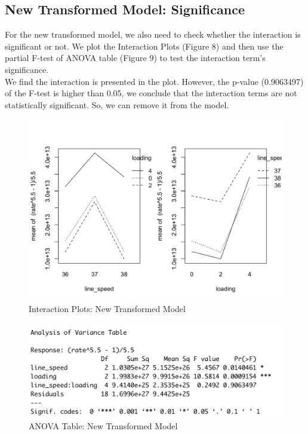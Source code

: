 \documentclass[11pt,a4paper]{article}
\begin{document}
\subsection{New Transformed Model: Significance}
For the new transformed model, we also need to check whether the interaction is significant or not. We plot the Interaction Plots (Figure 8) and then use the partial F-test of ANOVA table (Figure 9) to test the interaction term's significance.\\
We find the interaction is presented in the plot. However, the p-value (0.9063497) of the F-test is higher than 0.05, we conclude that the interaction terms are not statistically significant. So, we can remove it from the model.\\
\begin{figure}[htb]
    \centering
    \includegraphics[scale=0.3]{inter3.png}
    \caption{Interaction Plots: New Transformed Model}
    \label{}
\end{figure}
\begin{figure}[htb]
    \centering
    \includegraphics[scale=0.8]{inter4.png}
    \caption{ANOVA Table: New Transformed Model}
    \label{}
\end{figure}
\end{document}
